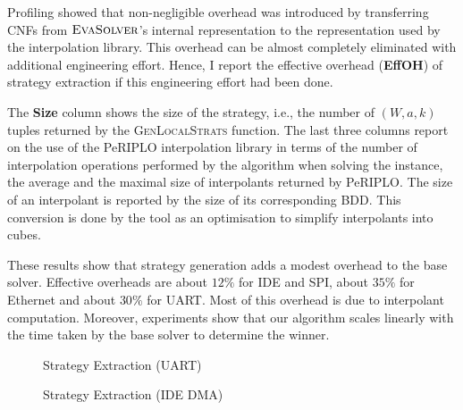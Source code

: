 Profiling showed that non-negligible overhead was introduced by transferring CNFs from $\textsc{EvaSolver}$'s internal representation to the representation used by the interpolation library.  This overhead can be almost completely eliminated with additional engineering effort.  Hence, I report the effective overhead (\textbf{EffOH}) of strategy extraction if this engineering effort had been done.

The \textbf{Size} column shows the size of the strategy, i.e., the number of $(W,a,k)$ tuples returned by the \textsc{GenLocalStrats} function.  The last three columns report on the use of the PeRIPLO interpolation library in terms of the number of interpolation operations performed by the algorithm when solving the instance, the average and the maximal size of interpolants returned by PeRIPLO.  The size of an interpolant is reported by the size of its corresponding BDD. This conversion is done by the tool as an optimisation to simplify interpolants into cubes.

These results show that strategy generation adds a modest overhead to the base solver.  Effective overheads are about $12\%$ for IDE and SPI, about $35\%$ for Ethernet and about $30\%$ for UART.  Most of this overhead is due to interpolant computation.  Moreover, experiments show that our algorithm scales linearly with the time taken by the base solver to determine the winner.  

\begin{figure}[ht]
    \centering
    \pgfplotsset{width=\textwidth, height=0.5\textheight}
    \caption{Strategy Extraction (UART)}
    \label{fig:uart2}
\end{figure}

\begin{figure}[hb]
    \centering
    \pgfplotsset{width=\textwidth, height=0.25\textheight}
    \caption{Strategy Extraction (IDE DMA)}
    \label{fig:ide2}
\end{figure}

